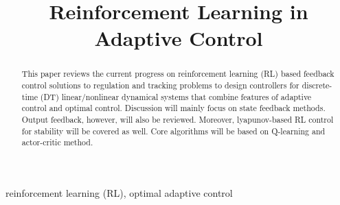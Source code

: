 \documentclass[conference]{IEEEtran}
\begin{document}
\title{Reinforcement Learning in Adaptive Control}

\author{
\and
{}
}
\maketitle

\begin{abstract}
This paper reviews the current progress on reinforcement learning (RL) based feedback control solutions to regulation and tracking problems to design controllers for discrete-time (DT) linear/nonlinear dynamical systems that combine features of adaptive control and optimal control. Discussion will mainly focus on state feedback methods. Output feedback, however, will also be reviewed. Moreover, lyapunov-based RL control for stability will be covered as well. Core algorithms will be based on Q-learning and actor-critic method.
\end{abstract}

\begin{IEEEkeywords}
reinforcement learning (RL), optimal adaptive control
\end{IEEEkeywords}
\end{document}
